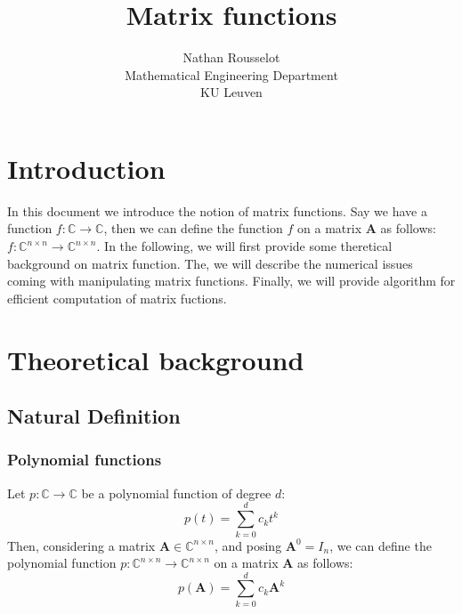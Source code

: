 \documentclass[12pt]{article}
\title{Matrix functions} %
\author{Nathan Rousselot\\Mathematical Engineering Department\\KU Leuven}
\begin{document}
\maketitle

\section{Introduction}
In this document we introduce the notion of matrix functions. Say we have a function $f:\mathbb{C}\rightarrow\mathbb{C}$, then we can define the function $f$ on a matrix $\mathbf{A}$ as follows: $f:\mathbb{C}^{n\times n}\rightarrow\mathbb{C}^{n\times n}$. In the following, we will first provide some theretical background on matrix function. The, we will describe the numerical issues coming with manipulating matrix functions. Finally, we will provide algorithm for efficient computation of matrix fuctions.

\section{Theoretical background}
\subsection{Natural Definition}
\subsubsection*{Polynomial functions}
Let $p:\mathbb{C}\rightarrow\mathbb{C}$ be a polynomial function of degree $d$:
\begin{equation}
    p(t) = \sum_{k=0}^d c_k t^k
\end{equation}
Then, considering a matrix $\mathbf{A}\in\mathbb{C}^{n\times n}$, and posing $\mathbf{A}^0 = I_n$, we can define the polynomial function $p:\mathbb{C}^{n\times n}\rightarrow\mathbb{C}^{n\times n}$ on a matrix $\mathbf{A}$ as follows:
\begin{equation}
    p(\mathbf{A}) = \sum_{k=0}^d c_k \mathbf{A}^k
\end{equation}
\end{document}

